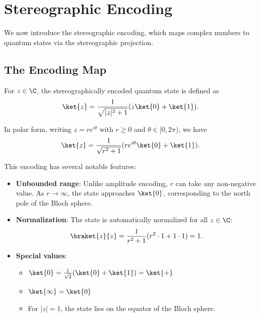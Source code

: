 \section{Stereographic Encoding}
\label{sec:encoding}

We now introduce the stereographic encoding, which maps complex numbers to quantum states via the stereographic projection.

\subsection{The Encoding Map}

\begin{definition}
\label{def:stereo-encoding}
For $z \in \C$, the stereographically encoded quantum state is defined as
\begin{equation}
    \label{eq:encoding-state}
    \ket{z} = \frac{1}{\sqrt{|z|^2 + 1}}(z\ket{0} + \ket{1}).
\end{equation}
\end{definition}

In polar form, writing $z = re^{i\theta}$ with $r \geq 0$ and $\theta \in [0, 2\pi)$, we have
\begin{equation}
    \label{eq:encoding-polar}
    \ket{z} = \frac{1}{\sqrt{r^2 + 1}}(re^{i\theta}\ket{0} + \ket{1}).
\end{equation}

This encoding has several notable features:

\begin{itemize}
    \item \textbf{Unbounded range}: Unlike amplitude encoding, $r$ can take any non-negative value. As $r \to \infty$, the state approaches $\ket{0}$, corresponding to the north pole of the Bloch sphere.
    
    \item \textbf{Normalization}: The state is automatically normalized for all $z \in \C$:
    \begin{equation}
        \braket{z}{z} = \frac{1}{r^2+1}(r^2 \cdot 1 + 1 \cdot 1) = 1.
    \end{equation}
    
    \item \textbf{Special values}:
    \begin{itemize}
        \item $\ket{0} = \frac{1}{\sqrt{2}}(\ket{0} + \ket{1}) = \ket{+}$
        \item $\ket{\infty} = \ket{0}$
        \item For $|z| = 1$, the state lies on the equator of the Bloch sphere.
    \end{itemize}
\end{itemize}

